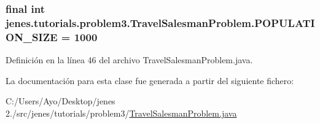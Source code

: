 \hypertarget{classjenes_1_1tutorials_1_1problem3_1_1_travel_salesman_problem_afda171e13788bcb67f73fd82bd89498b}{
\subsubsection[{P\-O\-P\-U\-L\-A\-T\-I\-O\-N\-\_\-\-S\-I\-Z\-E}]{\setlength{\rightskip}{0pt plus 5cm}final int jenes.\-tutorials.\-problem3.\-Travel\-Salesman\-Problem.\-P\-O\-P\-U\-L\-A\-T\-I\-O\-N\-\_\-\-S\-I\-Z\-E = 1000\hspace{0.3cm}{\ttfamily [static]}}}\label{classjenes_1_1tutorials_1_1problem3_1_1_travel_salesman_problem_afda171e13788bcb67f73fd82bd89498b}


Definición en la línea 46 del archivo Travel\-Salesman\-Problem.\-java.



La documentación para esta clase fue generada a partir del siguiente fichero\-:\begin{DoxyCompactItemize}
\item 
C\-:/\-Users/\-Ayo/\-Desktop/jenes 2./src/jenes/tutorials/problem3/\hyperlink{tutorials_2problem3_2_travel_salesman_problem_8java}{Travel\-Salesman\-Problem.\-java}\end{DoxyCompactItemize}
